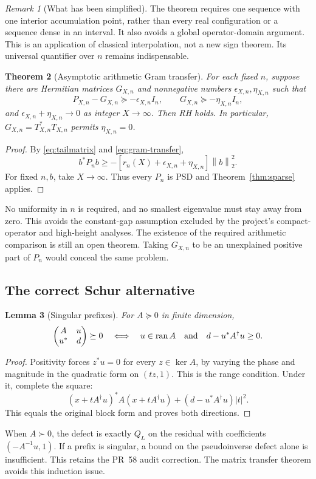 \documentclass[11pt,letterpaper]{article}
\newtheorem{theorem}{Theorem}[section]
\newtheorem{lemma}[theorem]{Lemma}
\theoremstyle{definition}
\theoremstyle{remark}
\newtheorem{remark}[theorem]{Remark}
\newcommand{\ran}{\operatorname{ran}}
\newcommand{\norm}[1]{\left\lVert#1\right\rVert}
\newcommand{\abs}[1]{\left\lvert#1\right\rvert}
\numberwithin{equation}{section}
\begin{document}
\begin{remark}[What has been simplified]
The theorem requires one sequence with one interior accumulation point, rather than every real configuration or a sequence dense in an interval. It also avoids a global operator-domain argument. This is an application of classical interpolation, not a new sign theorem. Its universal quantifier over $n$ remains indispensable.
\end{remark}

\begin{theorem}[Asymptotic arithmetic Gram transfer]\label{thm:transfer}
For each fixed $n$, suppose there are Hermitian matrices $G_{X,n}$ and nonnegative numbers $\epsilon_{X,n},\eta_{X,n}$ such that
\begin{equation}\label{eq:gram-transfer}
 P_{X,n}-G_{X,n}\succeq-\epsilon_{X,n}I_n,\qquad
 G_{X,n}\succeq-\eta_{X,n}I_n,
\end{equation}
and $\epsilon_{X,n}+\eta_{X,n}\to0$ as integer $X\to\infty$. Then RH holds.
In particular, $G_{X,n}=T_{X,n}^*T_{X,n}$ permits $\eta_{X,n}=0$.
\end{theorem}
\begin{proof}
By \eqref{eq:tailmatrix} and \eqref{eq:gram-transfer},
\[
 b^*P_nb\ge-[r_n(X)+\epsilon_{X,n}+\eta_{X,n}]\norm b_2^2.
\]
For fixed $n,b$, take $X\to\infty$. Thus every $P_n$ is PSD and Theorem~\ref{thm:sparse} applies.
\end{proof}

No uniformity in $n$ is required, and no smallest eigenvalue must stay away from zero. This avoids the constant-gap assumption excluded by the project's compact-operator and high-height analyses. The existence of the required arithmetic comparison is still an open theorem. Taking $G_{X,n}$ to be an unexplained positive part of $P_n$ would conceal the same problem.

\subsection{The correct Schur alternative}
\begin{lemma}[Singular prefixes]\label{lem:schur}
For $A\succeq0$ in finite dimension,
\[
 \begin{pmatrix}A&u\\u^*&d\end{pmatrix}\succeq0
 \quad\Longleftrightarrow\quad
 u\in\ran A\quad\hbox{and}\quad d-u^*A^\dagger u\ge0.
\]
\end{lemma}
\begin{proof}
Positivity forces $z^*u=0$ for every $z\in\ker A$, by varying the phase and magnitude in the quadratic form on $(tz,1)$. This is the range condition. Under it, complete the square:
\[
 (x+tA^\dagger u)^*A(x+tA^\dagger u)
 +(d-u^*A^\dagger u)\abs t^2.
\]
This equals the original block form and proves both directions.
\end{proof}
When $A\succ0$, the defect is exactly $Q_L$ on the residual with coefficients $(-A^{-1}u,1)$. If a prefix is singular, a bound on the pseudoinverse defect alone is insufficient. This retains the PR~58 audit correction. The matrix transfer theorem avoids this induction issue.
\end{document}
